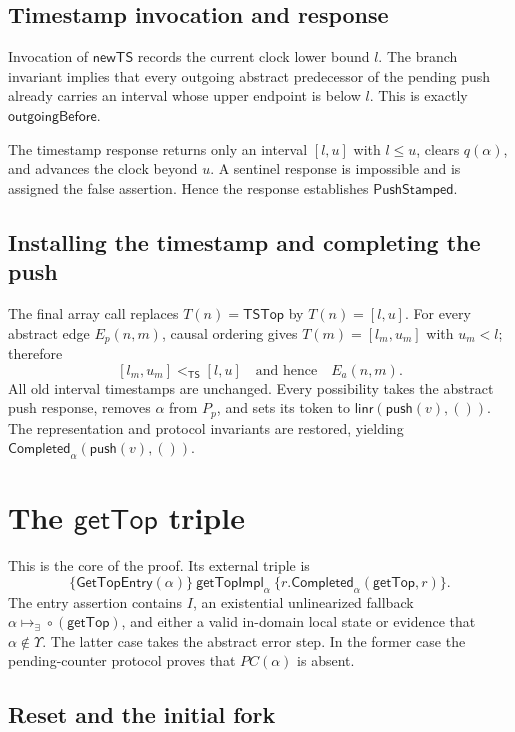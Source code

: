 \documentclass[11pt]{article}
\theoremstyle{definition}
\theoremstyle{remark}
\newcommand{\TS}{\mathsf{TS}}
\newcommand{\topts}{\mathsf{TSTop}}
\newcommand{\interval}[2]{[#1,#2]}
\newcommand{\Linr}{\mathsf{linr}}
\newcommand{\GetTop}{\mathsf{getTop}}
\newcommand{\Push}{\mathsf{push}}
\newcommand{\arrayedge}{E_{\!a}}
\newcommand{\sometok}[2]{#1\mathrel{\mapsto_{\exists}}#2}
\begin{document}
\subsection{Timestamp invocation and response}

Invocation of \(\mathsf{newTS}\) records the current clock lower bound \(l\).
The branch invariant implies that every outgoing abstract predecessor of the
pending push already carries an interval whose upper endpoint is below \(l\).
This is exactly \(\mathsf{outgoingBefore}\).

The timestamp response returns only an interval \(\interval{l}{u}\) with
\(l\le u\), clears \(q(\alpha)\), and advances the clock beyond \(u\).  A
sentinel response is impossible and is assigned the false assertion.  Hence
the response establishes \(\mathsf{PushStamped}\).

\subsection{Installing the timestamp and completing the push}

The final array call replaces \(T(n)=\topts\) by
\(T(n)=\interval{l}{u}\).  For every abstract edge \(E_p(n,m)\), causal
ordering gives \(T(m)=\interval{l_m}{u_m}\) with \(u_m<l\); therefore
\[
  \interval{l_m}{u_m}<_{\TS}\interval{l}{u}
  \quad\text{and hence}\quad \arrayedge(n,m).
\]
All old interval timestamps are unchanged.  Every possibility takes the
abstract push response, removes \(\alpha\) from \(P_p\), and sets its token to
\(\Linr(\Push(v),())\).  The representation and protocol invariants are
restored, yielding \(\mathsf{Completed}_\alpha(\Push(v),())\).

\section{The \texorpdfstring{\(\GetTop\)}{getTop} triple}

This is the core of the proof.  Its external triple is
\[
\boxed{
\{\mathsf{GetTopEntry}(\alpha)\}
\ \mathsf{getTopImpl}_\alpha\ 
\{r.\mathsf{Completed}_\alpha(\GetTop,r)\}.
}
\]
The entry assertion contains \(I\), an existential unlinearized fallback
\(\sometok{\alpha}{\circ(\GetTop)}\), and either a valid in-domain local state
or evidence that \(\alpha\notin\Upsilon\).  The latter case takes the abstract
error step.  In the former case the pending-counter protocol proves that
\(PC(\alpha)\) is absent.

\subsection{Reset and the initial fork}
\end{document}
